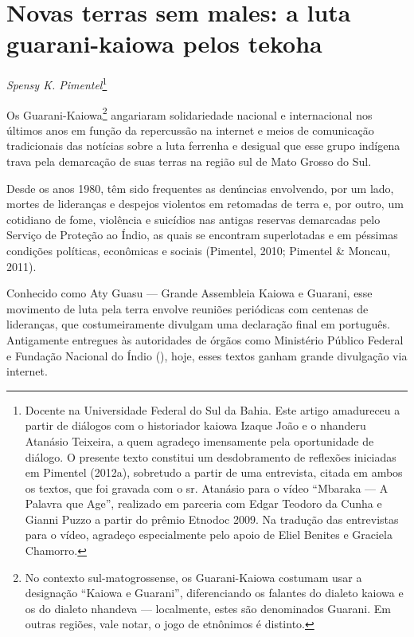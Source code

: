 \chapter{Novas terras sem males: a luta guarani-kaiowa pelos tekoha}
\begin{flushright}
\emph{Spensy K. Pimentel}\footnote{Docente na Universidade Federal do Sul da
Bahia. Este artigo amadureceu a partir de diálogos com o historiador
kaiowa Izaque João e o nhanderu Atanásio Teixeira, a quem agradeço
imensamente pela oportunidade de diálogo. O presente texto constitui um
desdobramento de reflexões iniciadas em Pimentel (2012a), sobretudo a
partir de uma entrevista, citada em ambos os textos, que foi gravada
com o sr. Atanásio para o vídeo ``Mbaraka — A Palavra que Age'',
realizado em parceria com Edgar Teodoro da Cunha e Gianni Puzzo a
partir do prêmio Etnodoc 2009. Na tradução das entrevistas para o
vídeo, agradeço especialmente pelo apoio de Eliel Benites e Graciela
Chamorro.} 
\end{flushright}

Os Guarani-Kaiowa\footnote{No contexto sul-matogrossense, os
Guarani-Kaiowa costumam usar a designação ``Kaiowa e Guarani'',
diferenciando os falantes do dialeto kaiowa e os do dialeto nhandeva ---
localmente, estes são denominados Guarani. Em outras regiões, vale
notar, o jogo de etnônimos é distinto.} angariaram solidariedade
nacional e internacional nos últimos anos em função da repercussão na
internet e meios de comunicação tradicionais das notícias sobre a luta
ferrenha e desigual que esse grupo indígena trava pela demarcação de
suas terras na região sul de Mato Grosso do Sul.

Desde os anos 1980, têm sido frequentes as denúncias envolvendo, por um
lado, mortes de lideranças e despejos violentos em retomadas de terra
e, por outro, um cotidiano de fome, violência e suicídios nas antigas
reservas demarcadas pelo Serviço de Proteção ao Índio, as quais se
encontram superlotadas e em péssimas condições políticas, econômicas e
sociais (Pimentel, 2010; Pimentel \& Moncau, 2011).

Conhecido como Aty Guasu --- Grande Assembleia Kaiowa e Guarani, esse
movimento de luta pela terra envolve reuniões periódicas com centenas
de lideranças, que costumeiramente divulgam uma declaração final em
português. Antigamente entregues às autoridades de órgãos como
Ministério Público Federal e Fundação Nacional do Índio (), hoje,
esses textos ganham grande divulgação via internet.

